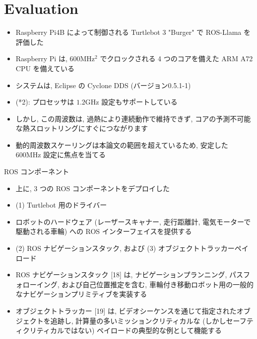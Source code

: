 
\section{Evaluation}
\label{sec: evaluation}

\begin{frame}{}
    \begin{itemize}
        \item Raspberry Pi4B によって制御される Turtlebot 3 "Burger" で ROS-Llama を評価した
\item Raspberry Pi は, $600 \mathrm{MHz}{ }^{2}$ でクロックされる 4 つのコアを備えた ARM A72 CPU を備えている
\item システムは, Eclipse の Cyclone DDS (バージョン0.5.1-1)
\item (*2): プロセッサは $1.2 \mathrm{GHz}$ 設定もサポートしている
\item しかし, この周波数は, 過熱により連続動作で維持できず, コアの予測不可能な熱スロットリングにすぐにつながります
\item 動的周波数スケーリングは本論文の範囲を超えているため, 安定した $600 \mathrm{MHz}$ 設定に焦点を当てる
    \end{itemize}
\end{frame}

\begin{frame}{ROS コンポーネント}
    \begin{itemize}
        \item 上に, 3 つの ROS コンポーネントをデプロイした
\item (1) Turtlebot 用のドライバー
\item ロボットのハードウェア (レーザースキャナー, 走行距離計, 電気モーターで駆動される車輪) への ROS インターフェイスを提供する
\item (2) ROS ナビゲーションスタック, および (3) オブジェクトトラッカーペイロード
    \end{itemize}
\end{frame}

\begin{frame}{}
    \begin{itemize}
        \item ROS ナビゲーションスタック [18] は, ナビゲーションプランニング, パスフォローイング, および自己位置推定を含む, 車輪付き移動ロボット用の一般的なナビゲーションプリミティブを実装する
\item オブジェクトトラッカー [19] は, ビデオシーケンスを通じて指定されたオブジェクトを追跡し, 計算量の多いミッションクリティカルな (しかしセーフティクリティカルではない) ペイロードの典型的な例として機能する
    \end{itemize}
\end{frame}

